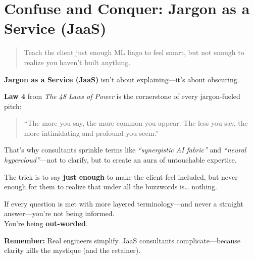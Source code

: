 \section{Confuse and Conquer: Jargon as a Service (JaaS)}

\begin{quote}
Teach the client just enough ML lingo to feel smart, but not enough to realize you haven’t built anything.
\end{quote}

  \textbf{Jargon as a Service (JaaS)} isn’t about explaining—it’s about obscuring.
  
  \medskip
  
  \textbf{Law 4} from \textit{The 48 Laws of Power} is the cornerstone of every jargon-fueled pitch:
  \begin{quote}
  ``The more you say, the more common you appear. The less you say, the more intimidating and profound you seem.''
  \end{quote}
  
  \medskip
  
  That’s why consultants sprinkle terms like \textit{``synergistic AI fabric''} and \textit{``neural hypercloud''}—not to clarify, but to create an aura of untouchable expertise.
  
  \medskip
  
  The trick is to say \textbf{just enough} to make the client feel included, but never enough for them to realize that under all the buzzwords is… nothing.
  
  \medskip
  
  If every question is met with more layered terminology—and never a straight answer—you’re not being informed. \\
  You’re being \textbf{out-worded}.
  
  \medskip
  
  \textbf{Remember:} Real engineers simplify. JaaS consultants complicate—because clarity kills the mystique (and the retainer).
  
  

